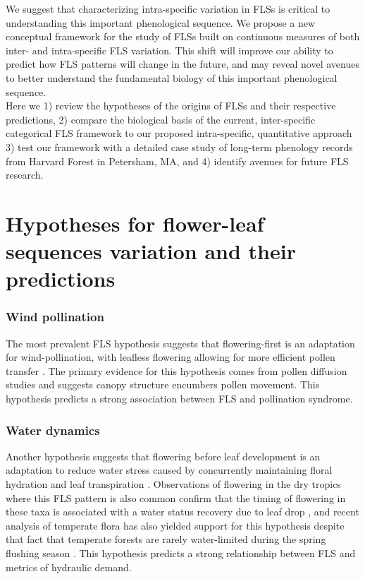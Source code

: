 \documentclass[12pt]{article}
\begin{document}
We suggest that characterizing intra-specific variation in FLSs is critical to understanding this important phenological sequence. We propose a new conceptual framework for the study of FLSs built on continuous measures of both inter- and intra-specific FLS variation. This shift will improve our ability to predict how FLS patterns will change in the future, and  may reveal novel avenues to better understand the fundamental biology of this important phenological sequence.\\


\noindent Here we 1) review the hypotheses of the origins of FLSs and their respective predictions, 2) compare the biological basis of the current, inter-specific categorical FLS framework to our proposed intra-specific, quantitative approach 3) test our framework with a detailed case study of long-term phenology records from Harvard Forest in Petersham, MA, and 4) identify avenues for future FLS research.

\section*{Hypotheses for flower-leaf sequences variation and their predictions}
\subsubsection*{ Wind pollination}
\noindent The most prevalent FLS hypothesis suggests that flowering-first is an adaptation for wind-pollination, with leafless flowering allowing for more efficient pollen transfer \citep{Whitehead1969}. The primary evidence for this hypothesis comes from pollen diffusion studies \citep[e.g., particle movement through closed and open canopies,][]{Niklas1985, Milleron2012} and suggests canopy structure encumbers pollen movement. This hypothesis predicts a strong association between FLS and pollination syndrome.
\subsubsection*{Water dynamics}
\noindent Another hypothesis suggests that flowering before leaf development is an adaptation to reduce water stress caused by concurrently maintaining floral hydration and leaf transpiration \citep{Franklin2016}. Observations of flowering in the dry tropics where this FLS pattern is also common confirm that the timing of flowering in these taxa is associated with a water status recovery due to leaf drop \citep{Borchert1983,Reich1984}, and recent analysis of temperate flora has also yielded support for this hypothesis despite that fact that temperate forests are rarely water-limited during the spring flushing season \citep{Gougherty2018}. This hypothesis predicts a strong relationship between FLS and metrics of hydraulic demand.
 
\end{document}
